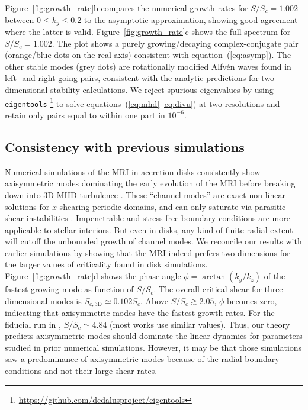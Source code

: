 \documentclass[openacc]{rsproca_new}%
\newcommand{\SSC}{S/S_{c}}
\begin{document}
Figure~\ref{fig:growth_rate}b compares the numerical growth rates for $\SSC=1.002$ between $0\le{k_{y}}\le0.2$ to the asymptotic approximation, showing good agreement where the latter is valid.
Figure~\ref{fig:growth_rate}c shows the full spectrum for $\SSC=1.002$.
The plot shows a purely growing/decaying complex-conjugate pair (orange/blue dots on the real axis) consistent with equation~(\ref{eq:asymp}).
The other stable modes (grey dots) are rotationally modified Alfv\'{e}n waves found in left- and right-going pairs, consistent with the analytic predictions for two-dimensional stability calculations.
We reject spurious eigenvalues by using \texttt{eigentools} \footnote{\protect\url{https://github.com/dedalusproject/eigentools}} to solve equations~(\ref{eq:mhd}-\ref{eq:divu}) at two resolutions and retain only pairs equal to within one part in $10^{-6}$.

\subsection{Consistency with previous simulations}
\label{sec:prior_work}


Numerical simulations of the MRI in accretion disks consistently show axisymmetric modes dominating the early evolution of the MRI before breaking down into 3D MHD turbulence \cite{1995ApJ...440..742H,2018ApJ...853..174H,2019ApJS..241...26D}. 
These ``channel modes'' are exact non-linear solutions for $x$-shearing-periodic domains, and can only saturate via parasitic shear instabilities \cite{1994ApJ...432..213G}.
Impenetrable and stress-free boundary conditions are more applicable to stellar interiors. 
But even in disks, any kind of finite radial extent will cutoff the unbounded growth of channel modes. 
We reconcile our results with earlier simulations by showing that the MRI indeed prefers two dimensions for the larger values of criticality found in disk simulations. 
Figure~\ref{fig:growth_rate}d shows the phase angle $\phi=\arctan(k_{y}/k_{z})$ of the fastest growing mode as function of $\SSC$.
The overall critical shear for three-dimensional modes is $S_{c,\text{3D}}\simeq0.102S_c$.
Above $\SSC\gtrsim2.05$, $\phi$ becomes zero, indicating that axisymmetric modes have the fastest growth rates.
For the fiducial run in \cite{1996ApJ...464..690H}, $\SSC\simeq4.84$ (most works use similar values).
Thus, our theory predicts axisymmetric modes should dominate the linear dynamics for parameters studied in prior numerical simulations.
However, it may be that those simulations saw a predominance of axisymmetric modes because of the radial boundary conditions and not their large shear rates.
\end{document}
